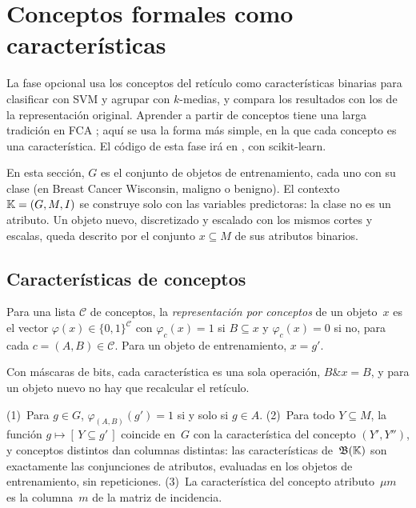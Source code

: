 \section{Conceptos formales como características}
\label{sec:ml}

La fase opcional usa los conceptos del retículo como características binarias para clasificar con SVM y agrupar con $k$-medias, y compara los resultados con los de la representación original. Aprender a partir de conceptos tiene una larga tradición en FCA \parencite{kuznetsov2004ml}; aquí se usa la forma más simple, en la que cada concepto es una característica. El código de esta fase irá en , con scikit-learn.

En esta sección, $G$ es el conjunto de objetos de entrenamiento, cada uno con su clase (en Breast Cancer Wisconsin, maligno o benigno). El contexto $\mathbb{K} = (G, M, I)$ se construye solo con las variables predictoras: la clase no es un atributo. Un objeto nuevo, discretizado y escalado con los mismos cortes y escalas, queda descrito por el conjunto $x \subseteq M$ de sus atributos binarios.


\subsection{Características de conceptos}
\label{sec:caracteristicas}

\begin{definicion}\label{def:caracteristicas}
Para una lista $\mathcal{C}$ de conceptos, la \emph{representación por conceptos} de un objeto~$x$ es el vector $\varphi(x) \in \{0, 1\}^{\mathcal{C}}$ con $\varphi_c(x) = 1$ si $B \subseteq x$ y $\varphi_c(x) = 0$ si no, para cada $c = (A, B) \in \mathcal{C}$. Para un objeto de entrenamiento, $x = g'$.
\end{definicion}

Con máscaras de bits, cada característica es una sola operación, $B \mathbin{\&} x = B$, y para un objeto nuevo no hay que recalcular el retículo.

\begin{proposicion}\label{prop:conjunciones}
(1)~Para $g \in G$, $\varphi_{(A, B)}(g') = 1$ si y solo si $g \in A$. (2)~Para todo $Y \subseteq M$, la función $g \mapsto [\, Y \subseteq g' \,]$ coincide en~$G$ con la característica del concepto $(Y', Y'')$, y conceptos distintos dan columnas distintas: las características de~$\mathfrak{B}(\mathbb{K})$ son exactamente las conjunciones de atributos, evaluadas en los objetos de entrenamiento, sin repeticiones. (3)~La característica del concepto atributo~$\mu m$ es la columna~$m$ de la matriz de incidencia.
\end{proposicion}


